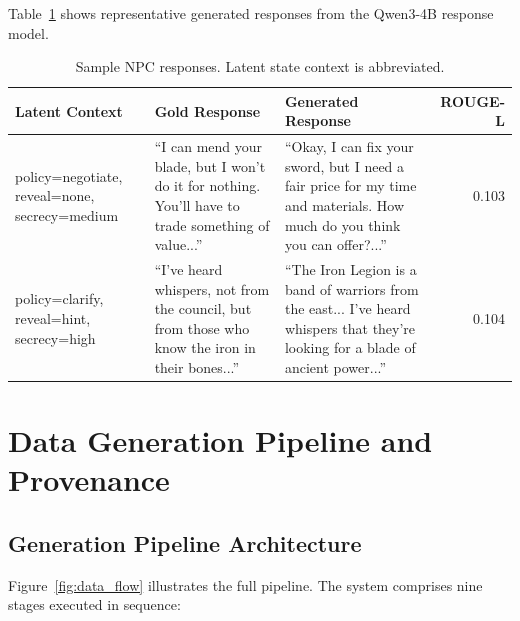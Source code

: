 \documentclass[11pt]{article}
\begin{document}
Table~\ref{tab:samples} shows representative generated responses from the Qwen3-4B response model.

\begin{table}[h]
\centering
\caption{Sample NPC responses. Latent state context is abbreviated.}
\label{tab:samples}
\scriptsize
\begin{tabular}{@{}p{3.5cm}p{4cm}p{4cm}r@{}}
\toprule
\textbf{Latent Context} & \textbf{Gold Response} & \textbf{Generated Response} & \textbf{ROUGE-L} \\
\midrule
policy=negotiate, reveal=none, secrecy=medium &
``I can mend your blade, but I won't do it for nothing. You'll have to trade something of value...'' &
``Okay, I can fix your sword, but I need a fair price for my time and materials. How much do you think you can offer?...'' &
0.103 \\
\midrule
policy=clarify, reveal=hint, secrecy=high &
``I've heard whispers, not from the council, but from those who know the iron in their bones...'' &
``The Iron Legion is a band of warriors from the east... I've heard whispers that they're looking for a blade of ancient power...'' &
0.104 \\
\bottomrule
\end{tabular}
\end{table}

\section{Data Generation Pipeline and Provenance}
\label{app:datagen}

\subsection{Generation Pipeline Architecture}

Figure~\ref{fig:data_flow} illustrates the full pipeline.
The system comprises nine stages executed in sequence:
\end{document}
